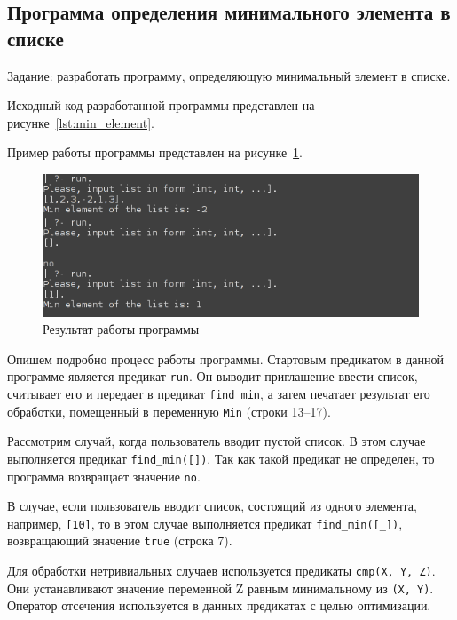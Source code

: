 \pagebreak

\subsection{Программа определения минимального элемента в списке}

Задание: разработать программу, определяющую
минимальный элемент в списке.

Исходный код разработанной программы представлен на
рисунке~\ref{lst:min_element}.

Пример работы программы представлен на рисунке~\ref{fig:min_element}.

\begin{figure}[h!]
  \centering
  \includegraphics[width=120mm]{img/min_element}
  \caption{Результат работы программы}
  \label{fig:min_element}
\end{figure}



Опишем подробно процесс работы программы.
Стартовым предикатом в данной программе является предикат \texttt{run}.
Он выводит приглашение ввести список, считывает его и передает в предикат
\texttt{find\_min}, а затем печатает результат его обработки,
помещенный в переменную \texttt{Min} (строки 13--17).

Рассмотрим случай, когда пользователь вводит пустой список. 
В этом случае выполняется предикат \texttt{find\_min([])}.
Так как такой предикат не определен, то программа возвращает значение \texttt{no}.

В случае, если пользователь вводит список, состоящий из одного элемента, 
например, \texttt{[10]}, то в этом случае выполняется предикат \texttt{find\_min([\_])},
возвращающий значение \texttt{true} (строка 7). 

Для обработки нетривиальных случаев используется предикаты \texttt{cmp(X, Y, Z)}.
Они устанавливают значение переменной Z равным минимальному из \texttt{(X, Y)}.
Оператор отсечения используется в данных предикатах с целью оптимизации.

